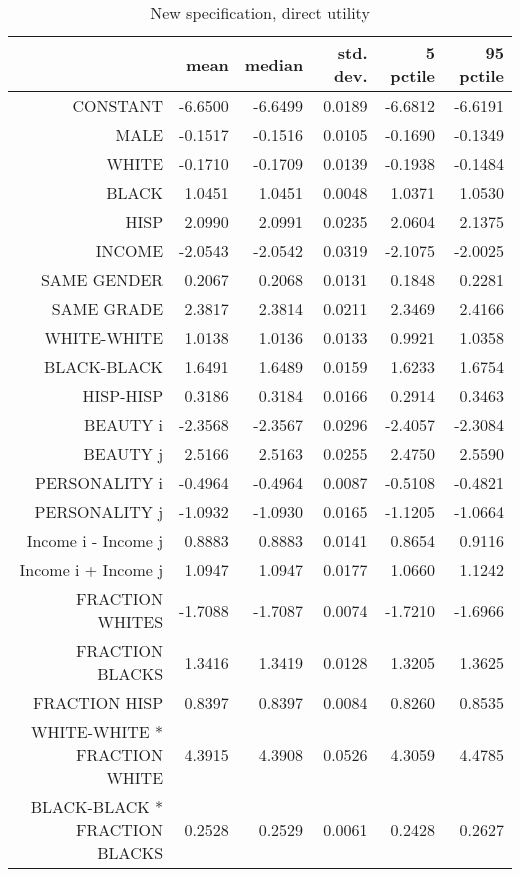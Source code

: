 \begin{table}[ht]
\caption{New specification, direct utility}
\centering
\begin{tabular}{rrrrrr}
  \hline
 & mean & median & std. dev. & 5 pctile & 95 pctile \\ 
  \hline
CONSTANT & -6.6500 & -6.6499 & 0.0189 & -6.6812 & -6.6191 \\ 
  MALE & -0.1517 & -0.1516 & 0.0105 & -0.1690 & -0.1349 \\ 
  WHITE & -0.1710 & -0.1709 & 0.0139 & -0.1938 & -0.1484 \\ 
  BLACK & 1.0451 & 1.0451 & 0.0048 & 1.0371 & 1.0530 \\ 
  HISP & 2.0990 & 2.0991 & 0.0235 & 2.0604 & 2.1375 \\ 
  INCOME & -2.0543 & -2.0542 & 0.0319 & -2.1075 & -2.0025 \\ 
  SAME GENDER & 0.2067 & 0.2068 & 0.0131 & 0.1848 & 0.2281 \\ 
  SAME GRADE & 2.3817 & 2.3814 & 0.0211 & 2.3469 & 2.4166 \\ 
  WHITE-WHITE & 1.0138 & 1.0136 & 0.0133 & 0.9921 & 1.0358 \\ 
  BLACK-BLACK & 1.6491 & 1.6489 & 0.0159 & 1.6233 & 1.6754 \\ 
  HISP-HISP & 0.3186 & 0.3184 & 0.0166 & 0.2914 & 0.3463 \\ 
  BEAUTY i & -2.3568 & -2.3567 & 0.0296 & -2.4057 & -2.3084 \\ 
  BEAUTY j & 2.5166 & 2.5163 & 0.0255 & 2.4750 & 2.5590 \\ 
  PERSONALITY i & -0.4964 & -0.4964 & 0.0087 & -0.5108 & -0.4821 \\ 
  PERSONALITY j & -1.0932 & -1.0930 & 0.0165 & -1.1205 & -1.0664 \\ 
  Income i - Income j & 0.8883 & 0.8883 & 0.0141 & 0.8654 & 0.9116 \\ 
  Income i + Income j & 1.0947 & 1.0947 & 0.0177 & 1.0660 & 1.1242 \\ 
  FRACTION WHITES & -1.7088 & -1.7087 & 0.0074 & -1.7210 & -1.6966 \\ 
  FRACTION BLACKS & 1.3416 & 1.3419 & 0.0128 & 1.3205 & 1.3625 \\ 
  FRACTION HISP & 0.8397 & 0.8397 & 0.0084 & 0.8260 & 0.8535 \\ 
  WHITE-WHITE * FRACTION WHITE & 4.3915 & 4.3908 & 0.0526 & 4.3059 & 4.4785 \\ 
  BLACK-BLACK * FRACTION BLACKS & 0.2528 & 0.2529 & 0.0061 & 0.2428 & 0.2627 \\ 

\end{tabular}
\end{table}
